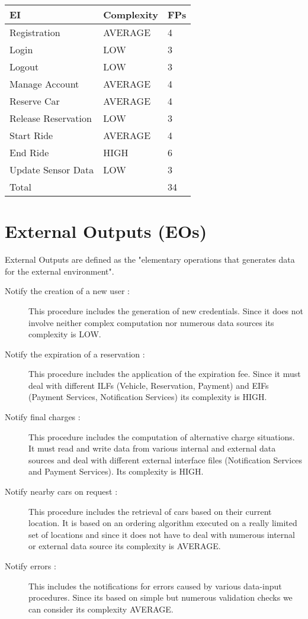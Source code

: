 \begin{center}
  \begin{tabular}{ |l|l|l| }
    \hline
    EI & Complexity & FPs \\ \hline
    Registration & AVERAGE & 4 \\ \hline
    Login & LOW & 3 \\ \hline
    Logout & LOW & 3 \\ \hline
    Manage Account & AVERAGE & 4 \\ \hline
    Reserve Car & AVERAGE & 4 \\ \hline
    Release Reservation & LOW & 3 \\ \hline
    Start Ride & AVERAGE & 4 \\ \hline
    End Ride & HIGH & 6 \\ \hline
    Update Sensor Data & LOW & 3 \\ \hline
    \multicolumn{2}{|l|}{Total} & 34 \\ \hline
  \end{tabular}
\end{center}


\newpage
\section{External Outputs (EOs)}

External Outputs are defined as the "elementary operations that generates data for the external environment". \\

\begin{description}
	\item [Notify the creation of a new user :] This procedure includes the generation of new credentials. Since it does not involve neither complex computation nor numerous data sources its complexity is LOW.
	\item [Notify the expiration of a reservation :] This procedure includes the application of the expiration fee. Since it must deal with different ILFs (Vehicle, Reservation, Payment) and EIFs (Payment Services, Notification Services) its complexity is HIGH.
	\item [Notify final charges :] This procedure includes the computation of alternative charge situations. It must read and write data from various internal and external data sources and deal with different external interface files (Notification Services and Payment Services). Its complexity is HIGH.
	\item [Notify nearby cars on request :] This procedure includes the retrieval of cars based on their current location. It is based on an ordering algorithm executed on a really limited set of locations and since it does not have to deal with numerous internal or external data source its complexity is AVERAGE.
	\item [Notify errors :] This includes the notifications for errors caused by various data-input procedures. Since its based on simple but numerous validation checks we can consider its complexity AVERAGE.
\end{description}

